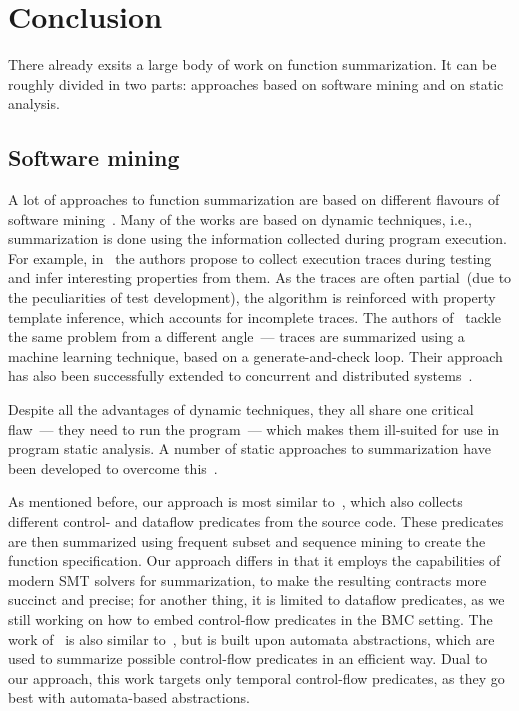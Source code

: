 \section{Conclusion}\label{sec:related-work}

There already exsits a large body of work on function summarization. It can be roughly divided in two parts: approaches based on software mining and on static analysis.

\subsection{Software mining}

A lot of approaches to function summarization are based on different flavours of software mining~\cite{Perracotta,Daikon,AssertsFromTraces,PredicateMining,AutomataMining}. Many of the works are based on dynamic techniques, i.e., summarization is done using the information collected during program execution. For example, in~\cite{Perracotta} the authors propose to collect execution traces during testing and infer interesting properties from them. As the traces are often partial~(due to the peculiarities of test development), the algorithm is reinforced with property template inference, which accounts for incomplete traces. The authors of~\cite{Daikon} tackle the same problem from a different angle~--- traces are summarized using a machine learning technique, based on a generate-and-check loop. Their approach has also been successfully extended to concurrent and distributed systems~\cite{CSight}.

Despite all the advantages of dynamic techniques, they all share one critical flaw~--- they need to run the program~--- which makes them ill-suited for use in program static analysis. A number of static approaches to summarization have been developed to overcome this~\cite{PredicateMining,AutomataMining}.

As mentioned before, our approach is most similar to~\cite{PredicateMining}, which also collects different control- and dataflow predicates from the source code. These predicates are then summarized using frequent subset and sequence mining to create the function specification. Our approach differs in that it employs the capabilities of modern SMT solvers for summarization, to make the resulting contracts more succinct and precise; for another thing, it is limited to dataflow predicates, as we still working on how to embed control-flow predicates in the BMC setting. The work of~\cite{AutomataMining} is also similar to~\cite{PredicateMining}, but is built upon automata abstractions, which are used to summarize possible control-flow predicates in an efficient way. Dual to our approach, this work targets only temporal control-flow predicates, as they go best with automata-based abstractions.

